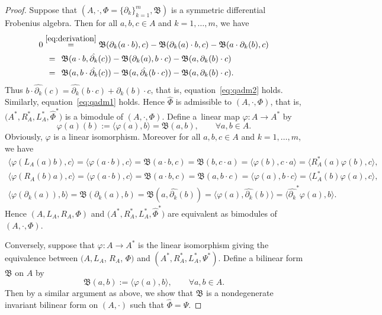 \documentclass[10pt,a4paper]{amsart}
\numberwithin{equation}{section}
\begin{document}
\begin{proof}
 Suppose that $(A, \cdot, \Phi= \{\partial_k\}_{k=1}^m, \mathfrak{B})$ is a symmetric differential Frobenius algebra.
 Then for all $a, b, c \in A$ and $k=1, \dots, m$, we have
 \begin{align*}
 0 &\overset{\eqref{eq:derivation}}{=} \mathfrak{B}(\partial_k(a \cdot b), c) - \mathfrak{B}(\partial_k(a) \cdot b, c)-\mathfrak{B}(a \cdot \partial_k(b), c) \\
 &\overset{\hphantom{(2.1)}}{=} \mathfrak{B}(a \cdot b, \hat{\partial_k}(c)) - \mathfrak{B}(\partial_k(a), b \cdot c) - \mathfrak{B}(a, \partial_k(b) \cdot c) \\
 &\overset{\hphantom{(2.1)}}{=} \mathfrak{B}(a, b \cdot \hat{\partial_k}(c)) - \mathfrak{B}(a, \hat{\partial_k}(b \cdot c)) - \mathfrak{B}(a, \partial_k(b) \cdot c).
 \end{align*}
 Thus $b \cdot \hat{\partial_k}(c) = \hat{\partial_k}(b \cdot c) + \partial_k(b) \cdot c$,
 that is, equation~\eqref{eq:qadm2} holds.
 Similarly, equation~\eqref{eq:qadm1} holds.
 Hence $\hat{\Phi}$ is admissible to $(A, \cdot, \Phi)$, that is,
 $\big(A^*, R_A^*, L_A^*, \hat{\Phi}^*\big)$ is a bimodule of $(A, \cdot, \Phi)$.
 Define a~linear map $\varphi\colon A \to A^*$ by
 \begin{equation*}
 \varphi(a)(b) := \langle \varphi(a), b \rangle = \mathfrak{B}(a, b), \qquad
 \forall a, b \in A.
 \end{equation*}
 Obviously, $\varphi$ is a linear isomorphism.
 Moreover for all $a, b, c \in A$ and $k=1, \dots, m$, we have
 \begin{gather*}
 \langle \varphi(L_A(a)b), c \rangle = \langle \varphi(a \cdot b), c \rangle = \mathfrak{B}(a \cdot b, c) = \mathfrak{B}(b, c \cdot a) = \langle \varphi(b),c \cdot a \rangle = \langle R_A^*(a)\varphi(b), c\rangle, \\
 \langle\varphi(R_A(b)a), c \rangle = \langle \varphi(a \cdot b), c \rangle = \mathfrak{B}(a \cdot b,c)=\mathfrak{B}(a,b \cdot c) = \langle \varphi(a), b \cdot c\rangle = \langle L_A^*(b)\varphi(a), c\rangle, \\
 \langle \varphi(\partial_k(a)), b \rangle = \mathfrak{B}(\partial_k(a), b) = \mathfrak{B}(a, \hat{\partial_k}(b)) = \langle \varphi(a), \hat{\partial_k}(b)\rangle = \langle \hat{\partial_k}^*\varphi(a), b \rangle.
 \end{gather*}
 Hence $(A, L_A, R_A, \Phi)$ and $\big(A^*, R_A^*, L_A^*, \hat{\Phi}^*\big)$ are equivalent as bimodules of $(A, \cdot, \Phi)$.

 Conversely, suppose that $\varphi\colon A \to A^*$ is the linear isomorphism giving the equivalence between $(A, L_A$, $R_A$, $\Phi)$ and $(A^*, R_A^*, L_A^*, \Psi^*)$.
 Define a bilinear form $\mathfrak{B}$ on $A$ by
 \begin{equation*}
 \mathfrak{B}(a, b) := \langle \varphi(a),b \rangle , \qquad \forall a, b \in A.
 \end{equation*}
 Then by a similar argument as above,
 we show that $\mathfrak{B}$ is a nondegenerate invariant bilinear form on $(A, \cdot)$
 such that $\hat{\Phi} = \Psi$.
\end{proof}
\end{document}
